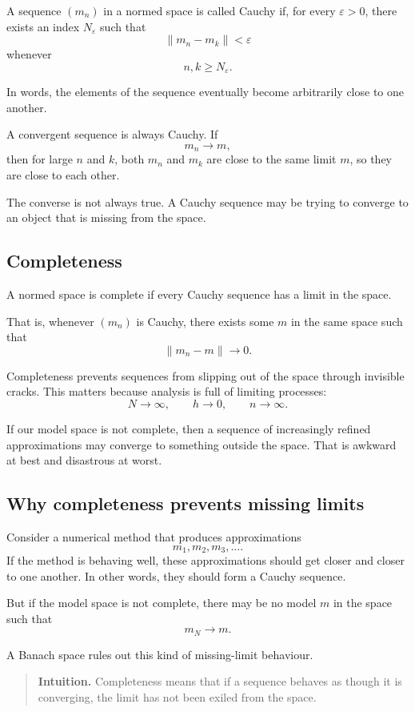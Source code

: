 \documentclass[11pt,a4paper]{book}
\newenvironment{intuition}
  {\begin{quote}\textbf{Intuition.}}
  {\end{quote}}
\begin{document}
A sequence $(m_n)$ in a normed space is called Cauchy if, for every
$\varepsilon>0$, there exists an index $N_\varepsilon$ such that
\[
    \|m_n-m_k\| < \varepsilon
\]
whenever
\[
    n,k\geq N_\varepsilon.
\]

In words, the elements of the sequence eventually become arbitrarily close to
one another.

A convergent sequence is always Cauchy. If
\[
    m_n\to m,
\]
then for large $n$ and $k$, both $m_n$ and $m_k$ are close to the same limit
$m$, so they are close to each other.

The converse is not always true. A Cauchy sequence may be trying to converge to
an object that is missing from the space.

\subsection{Completeness}

A normed space is complete if every Cauchy sequence has a limit in the space.

That is, whenever $(m_n)$ is Cauchy, there exists some $m$ in the same space
such that
\[
    \|m_n-m\|\to 0.
\]

Completeness prevents sequences from slipping out of the space through invisible
cracks. This matters because analysis is full of limiting processes:
\[
    N\to\infty,
    \qquad
    h\to 0,
    \qquad
    n\to\infty.
\]

If our model space is not complete, then a sequence of increasingly refined
approximations may converge to something outside the space. That is awkward at
best and disastrous at worst.

\subsection{Why completeness prevents missing limits}

Consider a numerical method that produces approximations
\[
    m_1,m_2,m_3,\ldots.
\]
If the method is behaving well, these approximations should get closer and
closer to one another. In other words, they should form a Cauchy sequence.

But if the model space is not complete, there may be no model $m$ in the space
such that
\[
    m_N\to m.
\]

A Banach space rules out this kind of missing-limit behaviour.

\begin{intuition}
Completeness means that if a sequence behaves as though it is converging, the
limit has not been exiled from the space.
\end{intuition}
\end{document}

